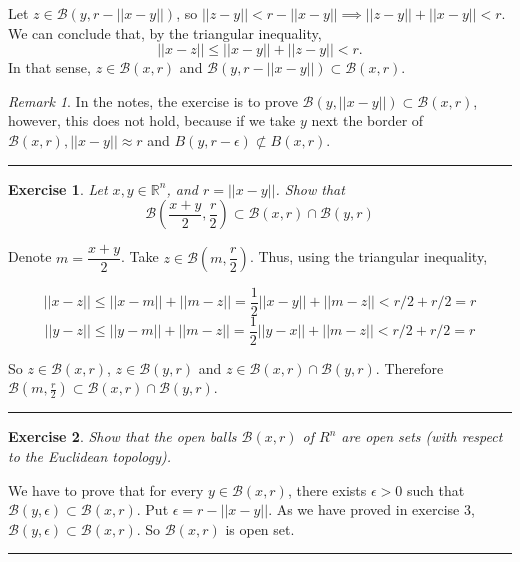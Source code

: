 \documentclass[a4paper,11pt]{article}
\newcommand{\linia}{\rule{\linewidth}{0.5pt}}
\theoremstyle{mytheor}
\theoremstyle{mytheor}
\newtheorem{exercise}{Exercise}
\theoremstyle{remark}
\newtheorem*{remark}{Remark}
\newcommand{\B}{\mathcal{B}}
\newcommand{\R}{\mathbb{R}}
\begin{document}
Let $z \in \B(y, r - ||x-y||)$, so $||z - y|| < r - ||x - y|| \implies ||z-y||
+ ||x-y|| < r$. We can conclude
that, by the triangular inequality,  
$$||x - z|| \le ||x - y|| + ||z - y|| < r.$$ 
In that sense, $z \in \B(x,r)$ and $\B(y, r - ||x - y||) \subset \B(x,r)$.

\begin{remark}
    In the notes, the exercise is to prove $\B(y,||x-y||) \subset \B(x,r)$,
    however, this does not hold, because if we take $y$ next the border of
    $\B(x,r), ||x - y|| \approx r$ and $B(y,r -\epsilon) \not \subset B(x,r)$.
\end{remark}

\noindent\linia

\begin{exercise}
    Let $x, y \in \R^n$, and $r = ||x - y||$. Show that
    $$
    \B\left(\frac{x + y}{2}, \frac{r}{2}\right) \subset \B(x, r) \cap \B(y, r)
    $$
\end{exercise}

Denote $m = \dfrac{x+y}{2}$. Take $z \in \B\left(m, \dfrac{r}{2}\right)$.
Thus, using the triangular inequality,

$$||x - z|| \le ||x - m|| + ||m - z|| = \frac{1}{2}||x - y|| + ||m - z|| < r/2
+ r/2 = r$$
$$||y - z|| \le ||y - m|| + ||m - z|| = \frac{1}{2}||y - x|| + ||m - z|| < r/2
+ r/2 = r$$

So $z \in \B(x,r)$, $z \in \B(y, r)$ and $z \in \B(x,r) \cap \B(y, r)$.
Therefore $\B(m, \frac{r}{2}) \subset \B(x, r) \cap \B(y, r)$.

\noindent\linia

\begin{exercise}
    Show that the open balls $\B(x, r)$ of $R^n$ are open sets (with respect
    to the Euclidean topology).
\end{exercise}

We have to prove that for every $y \in \B(x, r)$, there exists $\epsilon > 0$ such
that $\B(y, \epsilon) \subset \B(x, r)$. Put $\epsilon = r - ||x - y||$. As
we have proved in exercise 3, $\B(y, \epsilon) \subset \B(x,r)$. 
So $\B(x,r)$ is open set. 

\noindent\linia
\end{document}
